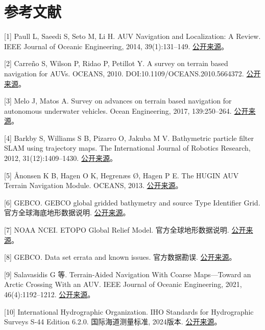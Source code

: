\hypertarget{ux53c2ux8003ux6587ux732e}{%
\section{参考文献}\label{ux53c2ux8003ux6587ux732e}}

{[}1{]} Paull L, Saeedi S, Seto M, Li H. AUV Navigation and Localization: A Review. IEEE Journal of Oceanic Engineering, 2014, 39(1):131--149. \href{https://people.csail.mit.edu/lpaull/publications/Paull_JOE_2014.pdf}{公开来源}。

{[}2{]} Carreño S, Wilson P, Ridao P, Petillot Y. A survey on terrain based navigation for AUVs. OCEANS, 2010. DOI:10.1109/OCEANS.2010.5664372. \href{https://eprints.soton.ac.uk/153897/1/Carreno_2010_-_A_survey__on_TBN_for_AUVs.pdf}{公开来源}。

{[}3{]} Melo J, Matos A. Survey on advances on terrain based navigation for autonomous underwater vehicles. Ocean Engineering, 2017, 139:250--264. \href{https://doi.org/10.1016/j.oceaneng.2017.04.047}{公开来源}。

{[}4{]} Barkby S, Williams S B, Pizarro O, Jakuba M V. Bathymetric particle filter SLAM using trajectory maps. The International Journal of Robotics Research, 2012, 31(12):1409--1430. \href{https://doi.org/10.1177/0278364912459666}{公开来源}。

{[}5{]} Ånonsen K B, Hagen O K, Hegrenæs Ø, Hagen P E. The HUGIN AUV Terrain Navigation Module. OCEANS, 2013. \href{https://www.navlab.net/Publications/The_HUGIN_AUV_Terrain_Navigation_Module.pdf}{公开来源}。

{[}6{]} GEBCO. GEBCO global gridded bathymetry and source Type Identifier Grid. 官方全球海底地形数据说明. \href{https://www.gebco.net/data_and_products/gridded_bathymetry_data/}{公开来源}。

{[}7{]} NOAA NCEI. ETOPO Global Relief Model. 官方全球地形数据说明. \href{https://www.ncei.noaa.gov/products/etopo-global-relief-model}{公开来源}。

{[}8{]} GEBCO. Data set errata and known issues. 官方数据勘误. \href{https://www.gebco.net/data-products/gridded-bathymetry-data/data-set-errata}{公开来源}。

{[}9{]} Salavasidis G 等. Terrain-Aided Navigation With Coarse Maps---Toward an Arctic Crossing With an AUV. IEEE Journal of Oceanic Engineering, 2021, 46(4):1192--1212. \href{https://eprints.soton.ac.uk/480480/1/joe.pdf}{公开来源}。

{[}10{]} International Hydrographic Organization. IHO Standards for Hydrographic Surveys S-44 Edition 6.2.0. 国际海道测量标准, 2024版本. \href{https://iho.int/uploads/user/pubs/standards/s-44/S-44_Edition_6.2.0_adopted.pdf}{公开来源}。

